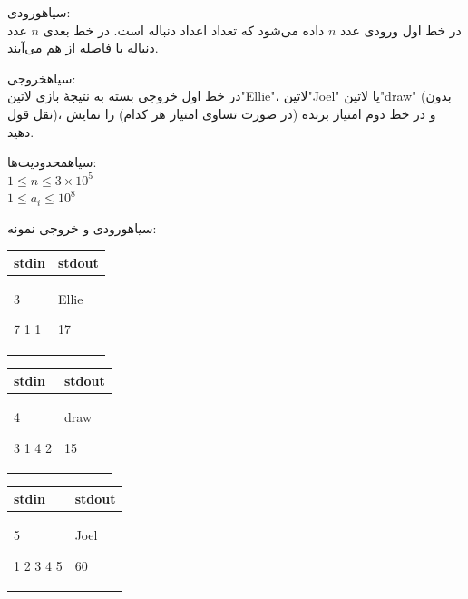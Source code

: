 ‌سیاه{ورودی:}\\
در خط اول ورودی عدد $n$ داده می‌شود که تعداد اعداد دنباله است. در خط بعدی $n$ عدد دنباله با فاصله از هم می‌آیند.

‌سیاه{خروجی:}\\
در خط اول خروجی بسته به نتیجۀ بازی ‌لاتین{"Ellie"}، ‌لاتین{"Joel"} یا ‌لاتین{"draw"} (بدون نقل قول)، و در خط دوم امتیاز برنده (در صورت تساوی امتیاز هر کدام) را نمایش دهید.

‌سیاه{محدودیت‌ها:}\\
$1\leq n\leq 3 \times 10^5$\\
$1\leq a_i\leq 10^{8}$

‌سیاه{ورودی و خروجی نمونه:}\\


\begin{latin}
	\begin{tabularx}{\textwidth}{|X | X|}
		\hline
		\textbf{stdin} &
		\textbf{stdout}\\
		\hline
		3
		
		7 1 1&
		Ellie
		
		17\\
		\hline
		
	\end{tabularx}
\end{latin}


\begin{latin}
	\begin{tabularx}{\textwidth}{|X | X|}
		\hline
		\textbf{stdin} &
		\textbf{stdout}\\
		\hline
		4
		
		3 1 4 2&
		draw
		
		15\\
		\hline
		
	\end{tabularx}
\end{latin}

\begin{latin}
	\begin{tabularx}{\textwidth}{|X | X|}
		\hline
		\textbf{stdin} &
		\textbf{stdout}\\
		\hline
		5
		
		1 2 3 4 5&
		Joel
		
		60\\
		\hline
		
	\end{tabularx}
\end{latin}


